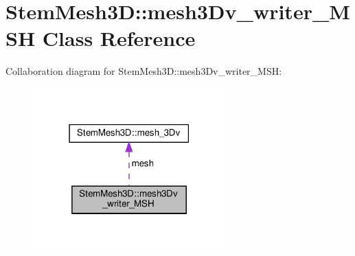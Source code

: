 \hypertarget{classStemMesh3D_1_1mesh3Dv__writer__MSH}{}\section{Stem\+Mesh3D\+:\+:mesh3\+Dv\+\_\+writer\+\_\+\+M\+SH Class Reference}
\label{classStemMesh3D_1_1mesh3Dv__writer__MSH}


Collaboration diagram for Stem\+Mesh3D\+:\+:mesh3\+Dv\+\_\+writer\+\_\+\+M\+SH\+:\nopagebreak
\begin{figure}[H]
\begin{center}
\leavevmode
\includegraphics[width=210pt]{classStemMesh3D_1_1mesh3Dv__writer__MSH__coll__graph}
\end{center}
\end{figure}
